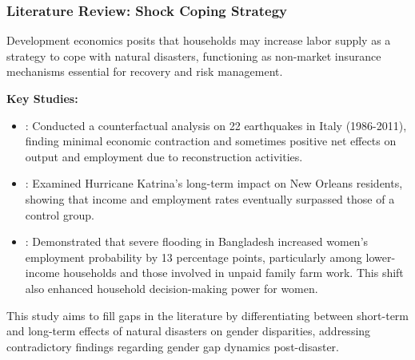 \documentclass[serif, aspectratio=169]{beamer}
\newcommand{\returnbutton}[2]{%
  \vspace{-1.0cm}  %
  \hfill  %
  \hyperlink{#1}{%
    {\footnotesize\beamerbutton{#2}}%
  }%
  \vspace{0.3cm}  %
}
\begin{document}
\begin{frame}[label=shock_coping_strategy]
\frametitle{Literature Review: Shock Coping Strategy}

\vspace{0.2cm} 

\returnbutton{literature_review2}{Return}


    Development economics posits that households may increase labor supply as a strategy to cope with natural disasters, functioning as non-market insurance mechanisms essential for recovery and risk management.
    
    \vspace{0.3cm}
    
    \textbf{Key Studies:}
    \begin{itemize}
        \item \citet{Porcelli2019TheItaly}: Conducted a counterfactual analysis on 22 earthquakes in Italy (1986-2011), finding minimal economic contraction and sometimes positive net effects on output and employment due to reconstruction activities.
        \item \citet{Deryugina2018TheReturns}: Examined Hurricane Katrina's long-term impact on New Orleans residents, showing that income and employment rates eventually surpassed those of a control group.
        \item \citet{Canessa2021WomensShocks}: Demonstrated that severe flooding in Bangladesh increased women's employment probability by 13 percentage points, particularly among lower-income households and those involved in unpaid family farm work. This shift also enhanced household decision-making power for women.
    \end{itemize}
    
    \vspace{0.2cm}
    
    This study aims to fill gaps in the literature by differentiating between short-term and long-term effects of natural disasters on gender disparities, addressing contradictory findings regarding gender gap dynamics post-disaster.
    
\end{frame}

\end{document}
